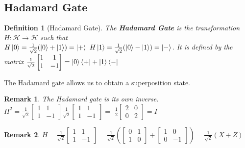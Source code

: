 \documentclass[12pt,twoside,fleqn]{report}
\theoremstyle{thmstyle}
\newtheorem{defn}{Definition}[chapter]
\newtheorem{remark}{Remark}[chapter]
\begin{document}
\subsection{Hadamard Gate}
\begin{defn}[Hadamard Gate]
    The \textbf{Hadamard Gate} is the transformation $H: \mathcal{H} \to \mathcal{H}$ such that \\
    $H \ket{0} = \frac{1}{\sqrt{2}} (\ket{0} + \ket{1}) = \ket{+}$
    $H \ket{1} = \frac{1}{\sqrt{2}} (\ket{0} - \ket{1}) = \ket{-}$.  It is defined by the matrix
    $\frac{1}{\sqrt{2}} \begin{bmatrix} 1 & 1 \\ 1 & -1 \end{bmatrix} = \ket{0}\bra{+} + \ket{1}\bra{-}$
\end{defn}
The Hadamard gate allows us to obtain a superposition state.

\begin{remark}
    The Hadamard gate is its own inverse.\\
    $H^2 = \frac{1}{\sqrt{2}} \begin{bmatrix} 1 & 1 \\ 1 & -1 \end{bmatrix} \frac{1}{\sqrt{2}} \begin{bmatrix} 1 & 1 \\ 1 & -1 \end{bmatrix} = $
    $\frac{1}{2} \begin{bmatrix}2 & 0 \\ 0 & 2 \end{bmatrix} = I$
\end{remark}
\begin{remark}
    $H =   \frac{1}{\sqrt{2}} \begin{bmatrix} 1 & 1 \\ 1 & -1 \end{bmatrix} = \frac{1}{\sqrt{2}} \left( \begin{bmatrix} 0 & 1 \\ 1 & 0 \end{bmatrix}  + \begin{bmatrix} 1 & 0 \\ 0 & -1 \end{bmatrix} \right) = \frac{1}{\sqrt{2}} (X + Z)$
\end{remark}
\end{document}
